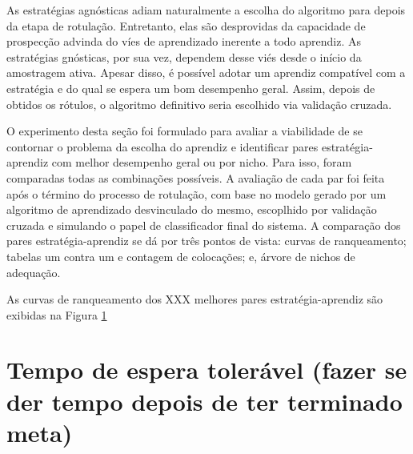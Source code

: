 As estratégias agnósticas adiam naturalmente a escolha do algoritmo para depois da
etapa de rotulação.
Entretanto, elas são desprovidas da capacidade de prospecção advinda do víes de
aprendizado inerente a todo aprendiz.
As estratégias gnósticas, por sua vez, dependem desse viés desde o início da amostragem ativa.
Apesar disso, é possível adotar um aprendiz compatível com a estratégia e do qual
se espera um bom desempenho geral.
Assim, depois de obtidos os rótulos, o algoritmo definitivo seria escolhido via validação cruzada.

O experimento desta seção foi formulado para avaliar a viabilidade de se contornar o
problema da escolha do aprendiz e identificar pares estratégia-aprendiz com melhor
desempenho geral ou por nicho.
Para isso, foram comparadas todas as combinações possíveis.
A avaliação de cada par foi feita após o término do processo de rotulação,
com base no modelo gerado por um algoritmo de aprendizado desvinculado do mesmo,
escoplhido por validação cruzada e simulando o papel de classificador final do sistema.
A comparação dos pares estratégia-aprendiz se dá por três pontos de vista:
curvas de ranqueamento; tabelas um contra um e contagem de colocações; e,
árvore de nichos de adequação.

As curvas de ranqueamento dos XXX melhores pares estratégia-aprendiz são exibidas
na Figura \ref{}

\section{Tempo de espera tolerável (fazer se der tempo depois de ter terminado meta)}



\citep{conf/amcis/Nah03}

% 
% 

